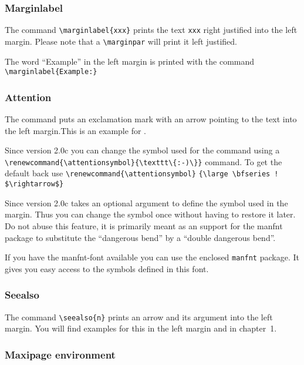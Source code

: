 \subsubsection{Marginlabel}

The command \verb|\marginlabel{xxx}| prints the text \texttt{xxx} right 
justified into the left margin. Please note that a 
\texttt{\textbackslash marginpar} will print it left justified.


 The word ``Example'' in the left margin is 
printed with the command \verb|\marginlabel{Example:}|

\subsubsection{Attention}

The command  puts an exclamation mark with an arrow 
pointing to the text into the left margin.\attention This is an 
example for .

\renewcommand{\attentionsymbol}{\texttt{:-)}}
\attention
Since version 2.0c you can change the symbol used for the 
 command using a 
\verb|\renewcommand{\attentionsymbol}{\texttt\{:-)\}}|
command. To get the default back use
\verb|\renewcommand{\attentionsymbol}| \verb|{\large \bfseries ! $\rightarrow$}|
\renewcommand{\attentionsymbol}{\large \bfseries ! $\rightarrow$}

Since version 2.0c  takes an optional argument to 
define the symbol used in the margin. Thus you can change the symbol 
once without having to restore it later. Do not abuse this 
feature\attention[\texttt{:-(}], it is primarily meant as an support 
for the manfnt package to substitute the ``dangerous bend'' by a 
``double dangerous bend''.

If you have the manfnt-font available you can use the enclosed 
\texttt{manfnt} package. It gives you easy 
access to the symbols defined in this font.

\subsubsection{Seealso}

The command \verb|\seealso{n}| prints an arrow and its argument into 
the left margin. You will find examples for this in the left margin 
and in  chapter~1.

\subsubsection{Maxipage environment}

